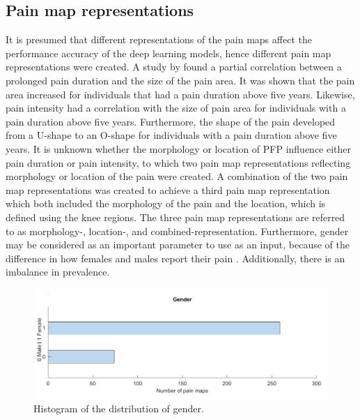 \subsection{Pain map representations} \label{sec:representation}
It is presumed that different representations of the pain maps affect the performance accuracy of the deep learning models, hence different pain map representations were created.
A study by \citeauthor{Boudreau2017} \citep{Boudreau2017} found a partial correlation between a prolonged pain duration and the size of the pain area. It was shown that the pain area increased for individuals that had a pain duration above five years. Likewise, pain intensity had a correlation with the size of pain area for individuals with a pain duration above five years. Furthermore, the shape of the pain developed from a U-shape to an O-shape for individuals with a pain duration above five years.\citep{Boudreau2017} \newline
\noindent
It is unknown whether the morphology or location of PFP influence either pain duration or pain intensity, to which two pain map representations reflecting morphology or location of the pain were created.
A combination of the two pain map representations was created to achieve a third pain map representation which both included the morphology of the pain and the location, which is defined using the knee regions. The three pain map representations are referred to as morphology-, location-, and combined-representation.
\noindent
Furthermore, gender may be considered as an important parameter to use as an input, because of the difference in how females and males report their pain \citep{Pieh2012}. Additionally, there is an imbalance in prevalence\citep{Rathleff2015}.

\begin{figure} [H]
\centering
\includegraphics[width=1\textwidth]{figures/histoGender}
\caption{Histogram of the distribution of gender.}
\label{fig:histogender}
\end{figure}

